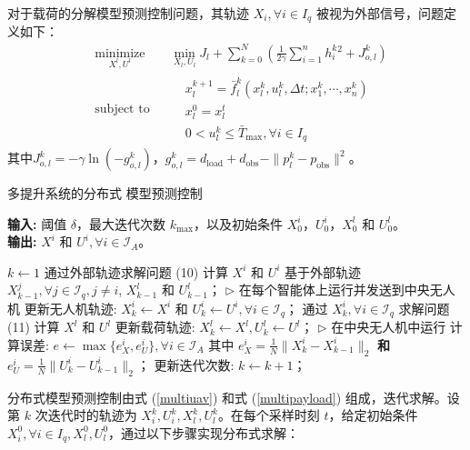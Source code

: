 \documentclass[lang=chs, degree=master, blindreview=false, winfonts=true]{yanputhesis}
\begin{document}
对于载荷的分解模型预测控制问题，其轨迹 $X_i, \forall i \in I_q$ 被视为外部信号，问题定义如下：
\begin{equation}
	\begin{aligned} 
	&\operatorname*{minimize}_{X^l, U^l}& & \min_{X_l, U_l} J_l + \sum_{k=0}^{N} \left( \frac{1}{2\gamma} \sum_{i=1}^{n} h_i^k{}^2 + J_{o,l}^k \right)\\
	&\text{subject to}& & \begin{aligned}
& x_l^{k+1} = \bar{f}_l^k(x_l^k, u_l^k, \Delta t; x_1^k, \cdots, x_n^k) \\
& x_l^0 = x_l^t\\
& 0 < u_l^k \leq \bar{T}_{\text{max}}, \forall i \in I_q		\end{aligned}	
\end{aligned}
\label{multipayload}
\end{equation}
其中$J_{o,l}^k = -\gamma \ln(-g_{o,l}^k)$，$g_{o,l}^k = d_{\text{load}} + d_{\text{obs}} - \|p_l^k - p_{\text{obs}}\|^2$。
\begin{algorithm}[h]
	\caption{多提升系统的分布式 模型预测控制}
	\label{alg:mpc_multilift}
	\textbf{输入:} 阈值 $\delta$，最大迭代次数 $k_{\text{max}}$，以及初始条件 $X^i_0$，$U^i_0$，$X^l_0$ 和 $U^l_0$。\\
	\textbf{输出:} $X^i$ 和 $U^i, \forall i \in \mathcal{I}_A$。
	
	\begin{algorithmic}[1]
	\State $k \gets 1$
			\State 通过外部轨迹求解问题 (10) 计算 $X^i$ 和 $U^i$
			\Statex \quad 基于外部轨迹 
			\Statex \quad $X^j_{k-1}, \forall j \in \mathcal{I}_q, j \neq i$, $X^l_{k-1}$ 和 $U^l_{k-1}$；
			\Statex \quad $\triangleright$ 在每个智能体上运行并发送到中央无人机
		\EndFor
		\State 更新无人机轨迹: $X^i_k \gets X^i$ 和 $U^i_k \gets U^i, \forall i \in \mathcal{I}_q$；
		\State 通过 $X^i_k, \forall i \in \mathcal{I}_q$ 求解问题 (11) 计算 $X^l$ 和 $U^l$
		\State 更新载荷轨迹: $X^l_k \gets X^l, U^l_k \gets U^l$；
		\Statex \quad $\triangleright$ 在中央无人机中运行
		\State 计算误差: $e \gets \max \{ e^i_X, e^i_U \}, \forall i \in \mathcal{I}_A$ 
		\Statex \quad 其中 $e^i_X = \frac{1}{N} \| X^i_k - X^i_{k-1} \|_2$ \textbf{和} 
		\Statex \quad $e^i_U = \frac{1}{N} \| U^i_k - U^i_{k-1} \|_2$；
		\State 更新迭代次数: $k \gets k + 1$；
	\EndWhile
	\end{algorithmic}
\end{algorithm}

分布式模型预测控制由式 (\ref{multiuav}) 和式 (\ref{multipayload}) 组成，迭代求解。设第 $k$ 次迭代时的轨迹为 $X_i^k, U_i^k, X_l^k, U_l^k$。在每个采样时刻 $t$，给定初始条件 $X_i^0, \forall i \in I_q, X_l^0, U_l^0$，通过以下步骤实现分布式求解：
\end{document}
